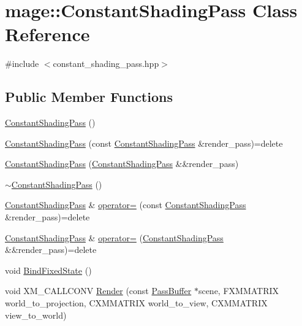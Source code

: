 \hypertarget{classmage_1_1_constant_shading_pass}{}\section{mage\+:\+:Constant\+Shading\+Pass Class Reference}
\label{classmage_1_1_constant_shading_pass}


{\ttfamily \#include $<$constant\+\_\+shading\+\_\+pass.\+hpp$>$}

\subsection*{Public Member Functions}
\begin{DoxyCompactItemize}
\item 
\hyperlink{classmage_1_1_constant_shading_pass_a21a8614cd67999bec82d260eb9aa78d7}{Constant\+Shading\+Pass} ()
\item 
\hyperlink{classmage_1_1_constant_shading_pass_a0dd8af518c8f6444368d64f9e24a3a13}{Constant\+Shading\+Pass} (const \hyperlink{classmage_1_1_constant_shading_pass}{Constant\+Shading\+Pass} \&render\+\_\+pass)=delete
\item 
\hyperlink{classmage_1_1_constant_shading_pass_afeb558851130d64579930be81198e946}{Constant\+Shading\+Pass} (\hyperlink{classmage_1_1_constant_shading_pass}{Constant\+Shading\+Pass} \&\&render\+\_\+pass)
\item 
\hyperlink{classmage_1_1_constant_shading_pass_a2ef56dc45910519d5e0137b14768738e}{$\sim$\+Constant\+Shading\+Pass} ()
\item 
\hyperlink{classmage_1_1_constant_shading_pass}{Constant\+Shading\+Pass} \& \hyperlink{classmage_1_1_constant_shading_pass_ada08b06e66c1d1da2f869b96b71f3202}{operator=} (const \hyperlink{classmage_1_1_constant_shading_pass}{Constant\+Shading\+Pass} \&render\+\_\+pass)=delete
\item 
\hyperlink{classmage_1_1_constant_shading_pass}{Constant\+Shading\+Pass} \& \hyperlink{classmage_1_1_constant_shading_pass_ae5ea38d9739b1a16257ee0a69c95b406}{operator=} (\hyperlink{classmage_1_1_constant_shading_pass}{Constant\+Shading\+Pass} \&\&render\+\_\+pass)=delete
\item 
void \hyperlink{classmage_1_1_constant_shading_pass_ab8d40634d0cd224c97ccb8dfbe43d45e}{Bind\+Fixed\+State} ()
\item 
void X\+M\+\_\+\+C\+A\+L\+L\+C\+O\+NV \hyperlink{classmage_1_1_constant_shading_pass_adfa9c8d7d723d2e5c1b49b2c3e34de46}{Render} (const \hyperlink{structmage_1_1_pass_buffer}{Pass\+Buffer} $\ast$scene, F\+X\+M\+M\+A\+T\+R\+IX world\+\_\+to\+\_\+projection, C\+X\+M\+M\+A\+T\+R\+IX world\+\_\+to\+\_\+view, C\+X\+M\+M\+A\+T\+R\+IX view\+\_\+to\+\_\+world)
\end{DoxyCompactItemize}
